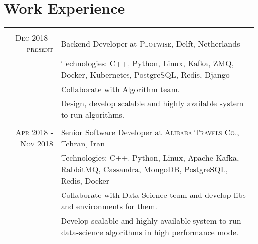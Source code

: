 \documentclass[a4paper,11pt]{article}
\begin{document}
\section{Work Experience}
\begin{tabular}{r|p{11cm}}

    \multicolumn{2}{c}{}\\
    \textsc{Dec 2018 - present}
    & Backend Developer at \textsc{Plotwise},
    Delft, Netherlands\\
    &\footnotesize{Technologies: C++, Python, Linux, Kafka, ZMQ, Docker, Kubernetes, PostgreSQL, Redis, Django}\\
    &\footnotesize{Collaborate with Algorithm team.}\\
    &\footnotesize{Design, develop scalable and highly available system to run algorithms.}\\

    \multicolumn{2}{c}{}\\
    \textsc{Apr 2018 - Nov 2018}
    & Senior Software Developer at \textsc{Alibaba Travels Co.},
    Tehran, Iran\\
    &\footnotesize{Technologies: C++, Python, Linux, Apache Kafka, RabbitMQ, Cassandra, MongoDB, PostgreSQL, Redis, Docker}\\
    &\footnotesize{Collaborate with Data Science team and develop libs and environments for them.}\\
    &\footnotesize{Develop scalable and highly available system to run data-science algorithms in high performance mode.}\\

\end{tabular}

\end{document}
